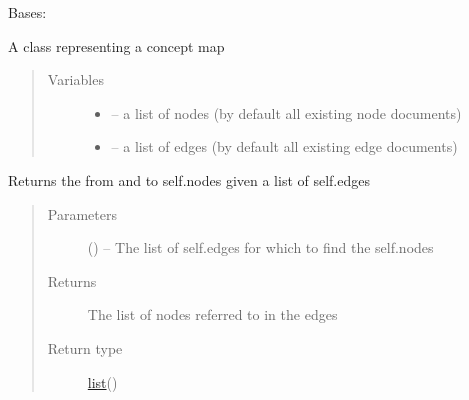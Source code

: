 \documentclass[letterpaper,10pt,english]{sphinxmanual}
\begin{document}
\begin{fulllineitems}
\label{\detokenize{concept_map:concept_map.ConceptMap}}
Bases: 

A class representing a concept map
\begin{quote}\begin{description}
\item[{Variables}] \leavevmode\begin{itemize}
\item {} 
 -- a list of nodes (by default all existing node documents)

\item {} 
 -- a list of edges (by default all existing edge documents)

\end{itemize}

\end{description}\end{quote}

\begin{fulllineitems}
\label{\detokenize{concept_map:concept_map.ConceptMap.find_nodes}}
Returns the from and to self.nodes given a list of self.edges
\begin{quote}\begin{description}
\item[{Parameters}] \leavevmode
{} (\href{https://docs.python.org/2/library/functions.html\#list}{}\sphinxstyleliteralemphasis{)}\sphinxstyleliteralemphasis{}) -- The list of self.edges for which to find the self.nodes

\item[{Returns}] \leavevmode
The list of nodes referred to in the edges

\item[{Return type}] \leavevmode
\href{https://docs.python.org/2/library/functions.html\#list}{list}({\hyperref[\detokenize{node:node.Node}]{}})

\end{description}\end{quote}


\end{fulllineitems}
\end{fulllineitems}
\end{document}
